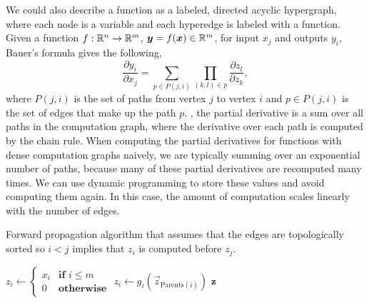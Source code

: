 We could also describe a function as a labeled, directed acyclic hypergraph, where each node is a variable
and each hyperedge is labeled with a function. Given a function
$f:\mathbb{R}^n\to\mathbb{R}^m$, $\bm{y}=f(\bm{x})\in\mathbb{R}^m$, for input $x_j$ and outputs
$y_i$, Bauer's formula gives the following, \[
    \frac{\partial y_i}{\partial x_j} = \sum_{p\in P(j,i)} \prod_{(k,l)\in p} \frac{\partial z_l}{\partial z_k},
\]
where $P(j,i)$ is the set of paths from vertex $j$ to vertex $i$ and $p\in
    P(j,i)$ is the set of edges that make up the path $p$. \Ie, the partial
derivative is a sum over all paths in the computation graph, where the
derivative over each path is computed by the chain
rule. When
computing the partial derivatives for functions with dense computation graphs
naively, we are typically summing over an exponential number of paths, because
many of these partial derivatives are recomputed many times. We can use dynamic
programming to store these values and avoid computing them again. In this case,
the amount of computation scales linearly with the number of edges.

\begin{algorithm}
    \caption{Forward propagation algorithm that assumes that the edges are
        topologically sorted so $i<j$ implies that $z_i$ is computed before $z_j$.}
    \label{alg:forward-propagation}

    \begin{algorithmic}[1]
        \State $z_i \gets \begin{cases}
                x_i & \textbf{if } i \leq m \\
                0   & \textbf{otherwise}
            \end{cases}$ 
        \State $z_i \gets g_i(\vec{z}_{\mathrm{Parents}(i)})$ 
        \EndFor
        \State \Return $\bm{z}$
        \EndFunction
    \end{algorithmic}
\end{algorithm}

